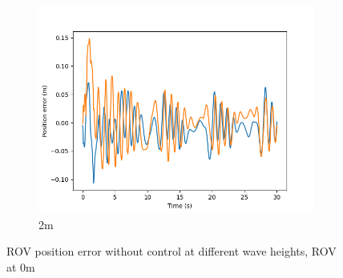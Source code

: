 \documentclass[class=article, crop=false]{standalone}
\begin{document}
\begin{figure}
\begin{subfigure}[b]{0.48\textwidth}
        \centering
        \includegraphics{scenario1/rov-0m/2.0m/rov_position_error_uncontrolled}
        \caption{2m}
        \label{}
    \end{subfigure}

    \caption{ROV position error without control at different wave heights, ROV at 0m}
\end{figure}
\end{document}
